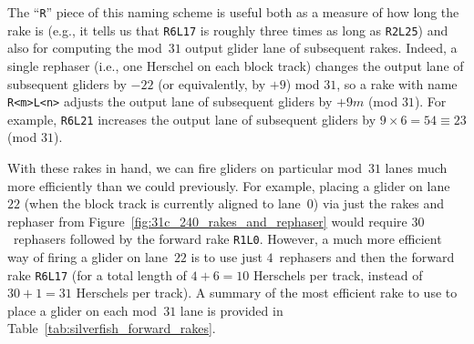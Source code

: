 The ``\texttt{R}'' piece of this naming scheme is useful both as a measure of how long the rake is (e.g., it tells us that \texttt{R6L17} is roughly three times as long as \texttt{R2L25}) and also for computing the mod~$31$ output glider lane of subsequent rakes. Indeed, a single rephaser (i.e., one Herschel on each block track) changes the output lane of subsequent gliders by $-22$ (or equivalently, by $+9$) mod $31$, so a rake with name \texttt{R<m>L<n>} adjusts the output lane of subsequent gliders by $+9m$ (mod $31$). For example, \texttt{R6L21} increases the output lane of subsequent gliders by $9 \times 6 = 54 \equiv 23$ (mod $31$).

With these rakes in hand, we can fire gliders on particular mod~$31$ lanes much more efficiently than we could previously. For example, placing a glider on lane~$22$ (when the block track is currently aligned to lane~$0$) via just the rakes and rephaser from Figure~\ref{fig:31c_240_rakes_and_rephaser} would require $30$~rephasers followed by the forward rake \texttt{R1L0}. However, a much more efficient way of firing a glider on lane~$22$ is to use just $4$~rephasers and then the forward rake \texttt{R6L17} (for a total length of $4 + 6 = 10$ Herschels per track, instead of $30 + 1 = 31$ Herschels per track). A summary of the most efficient rake to use to place a glider on each mod~$31$ lane is provided in Table~\ref{tab:silverfish_forward_rakes}.

